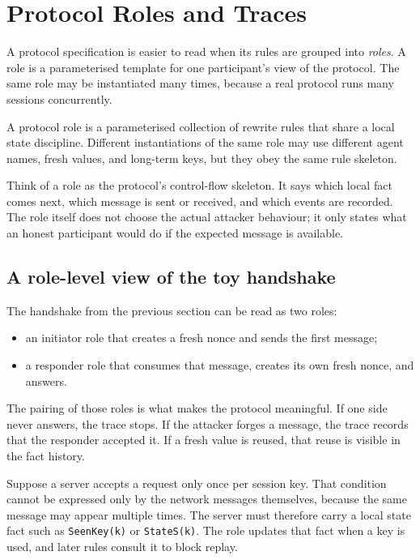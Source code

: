 
\section{Protocol Roles and Traces}
\label{sec:tamarin-roles-traces}

A protocol specification is easier to read when its rules are grouped into
\emph{roles}.  A role is a parameterised template for one participant's view
of the protocol.  The same role may be instantiated many times, because a
real protocol runs many sessions concurrently.

\begin{definition}
\label{def:tamarin-role}
A protocol role is a parameterised collection of rewrite rules that share a
local state discipline.  Different instantiations of the same role may use
different agent names, fresh values, and long-term keys, but they obey the
same rule skeleton.
\end{definition}

Think of a role as the protocol's control-flow skeleton.  It says which local
fact comes next, which message is sent or received, and which events are
recorded.  The role itself does not choose the actual attacker behaviour; it
only states what an honest participant would do if the expected message is
available.

\subsection{A role-level view of the toy handshake}

The handshake from the previous section can be read as two roles:
\begin{itemize}
  \item an initiator role that creates a fresh nonce and sends the first
        message;
  \item a responder role that consumes that message, creates its own fresh
        nonce, and answers.
\end{itemize}
The pairing of those roles is what makes the protocol meaningful.  If one
side never answers, the trace stops.  If the attacker forges a message, the
trace records that the responder accepted it.  If a fresh value is reused,
that reuse is visible in the fact history.

\begin{example}
Suppose a server accepts a request only once per session key.  That condition
cannot be expressed only by the network messages themselves, because the same
message may appear multiple times.  The server must therefore carry a local
state fact such as \texttt{SeenKey(k)} or \texttt{StateS(k)}.  The role
updates that fact when a key is used, and later rules consult it to block
replay.
\end{example}

